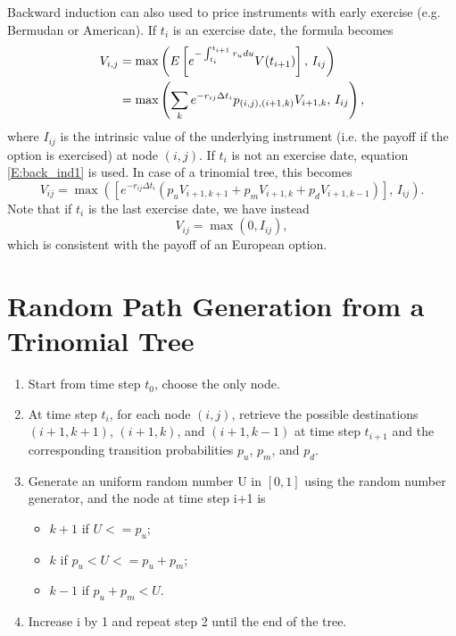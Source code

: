 Backward induction can also used to price instruments with early exercise
(e.g. Bermudan or American). If $t_i$ is an exercise date, the formula 
becomes
\begin{align} \label{E:back_ind2}
  V_{i,j} 
    &= \max 
         \left( 
           E \left[ e^{-\int_{t_i}^{t_{i+1}} r_u du} V(t_{i+1}) \right],
           \, I_{ij}
         \right) \notag \\
    &= \max
         \left( 
           \sum_k e^{-r_{ij} \Delta t_i} p_{(i,j),(i+1,k)} V_{i+1,k}, 
           \, I_{ij}
         \right),
\end{align}
where $I_{ij}$ is the intrinsic value of the underlying instrument (i.e. the
payoff if the option is exercised) at node $(i,j)$. If $t_i$ is not an 
exercise date, equation \ref{E:back_ind1} is used. In case of a trinomial 
tree, this becomes
\begin{equation}
  V_{ij} 
    = \max 
        \left(
          \left[ 
            e^{-r_{ij}\Delta t_i} 
            (p_u V_{i+1,k+1} + p_m V_{i+1,k} + p_d V_{i+1,k-1} ) 
          \right],\, I_{ij}
        \right).
\end{equation}
Note that if $t_i$ is the last exercise date, we have instead
\begin{equation}
  V_{ij} = \max (0, I_{ij} ),
\end{equation}
which is consistent with the payoff of an European option.

\section{Random Path Generation from a Trinomial Tree}
\begin{enumerate}
  \item Start from time step $t_0$, choose the only node.
  \item At time step $t_i$, for each node $(i,j)$, retrieve the possible
destinations $(i+1,k+1)$, $(i+1,k)$, and $(i+1,k-1)$ at time step 
$t_{i+1}$ and the corresponding transition probabilities $p_u$,
$p_m$, and $p_d$.
  \item Generate an uniform random number U in $[0,1]$ using the random number
generator, and the node at time step i+1 is
    \begin{itemize}
      \item $k+1$ if $U<=p_u$;
      \item $k$ if $p_u<U<=p_u+p_m$;
      \item $k-1$ if $p_u+p_m<U$.
    \end{itemize}
  \item Increase i by 1 and repeat step 2 until the end of the tree.
\end{enumerate}

